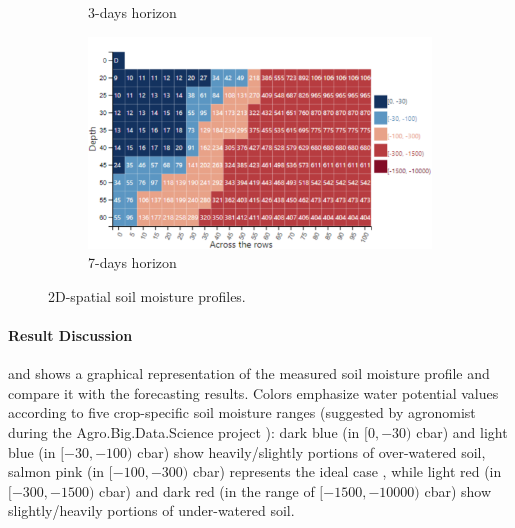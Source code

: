\begin{figure}[t]
\begin{subfigure}[b]{0.47\textwidth}
        \caption{3-days horizon}
        \label{orchard-fig:profile_c}
    \end{subfigure}
    \hfill
    \begin{subfigure}[b]{0.47\textwidth}
        \includegraphics[width=\textwidth]{chapters/physics-aware/orchard/img/7gg_profile.pdf}
        \caption{7-days horizon}
        \label{orchard-fig:profile_d}
    \end{subfigure}
    \caption{2D-spatial soil moisture profiles.}
    \label{orchard-fig:profiles}
\end{figure}

\paragraph{Result Discussion}  and  shows a graphical representation of the measured soil moisture profile and compare it with the forecasting results. Colors emphasize water potential values according to five crop-specific soil moisture ranges (suggested by agronomist during the Agro.Big.Data.Science project \cite{ABDS}):
dark blue (in $[0, -30)$ cbar) and light blue (in $[-30, -100)$ cbar) show heavily/slightly portions of over-watered soil, salmon pink (in $[-100, -300)$ cbar) represents the ideal case \cite{miller1998effects}, while light red (in $[-300, -1500)$ cbar) and dark red (in the range of $[-1500, -10000)$ cbar) show slightly/heavily portions of under-watered soil.

